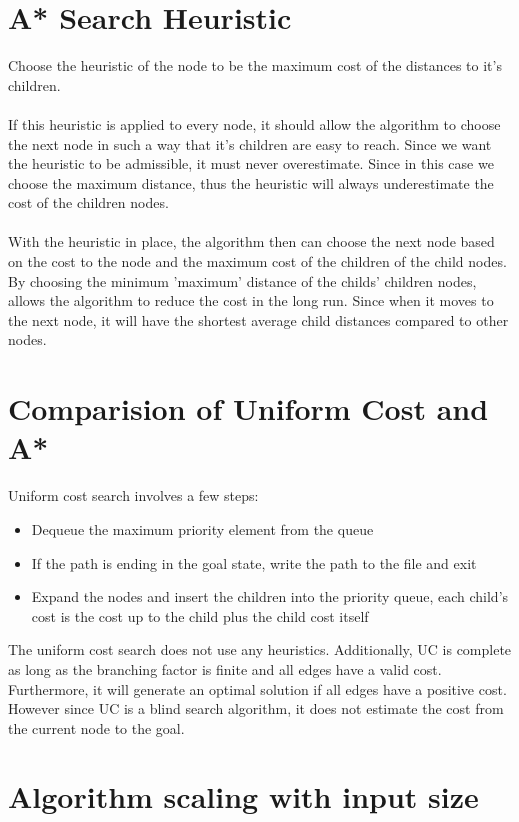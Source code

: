 \documentclass[12pt]{article}
\begin{document}
    \section{A* Search Heuristic}

    Choose the heuristic of the node to be the maximum cost of the distances to it's children.\\
    \\
    If this heuristic is applied to every node, it should allow the algorithm to choose the next node in such a way that it's children are easy to reach. Since we want the heuristic to be admissible, it must never overestimate. Since in this case we choose the maximum distance, thus the heuristic will always underestimate the cost of the children nodes.\\
    \\
    With the heuristic in place, the algorithm then can choose the next node based on the cost to the node and the maximum cost of the children of the child nodes. By choosing the minimum 'maximum' distance of the childs' children nodes, allows the algorithm to reduce the cost in the long run. Since when it moves to the next node, it will have the shortest average child distances compared to other nodes.

    \section{Comparision of Uniform Cost and A*}

    Uniform cost search involves a few steps:
    \begin{itemize}
        \item Dequeue the maximum priority element from the queue
        \item If the path is ending in the goal state, write the path to the file and exit
        \item Expand the nodes and insert the children into the priority queue, each child's cost is the cost up to the child plus the child cost itself
    \end{itemize}
    The uniform cost search does not use any heuristics. Additionally, UC is complete as long as the branching factor is finite and all edges have a valid cost. Furthermore, it will generate an optimal solution if all edges have a positive cost. However since UC is a blind search algorithm, it does not estimate the cost from the current node to the goal.

    \section{Algorithm scaling with input size}
\end{document}

